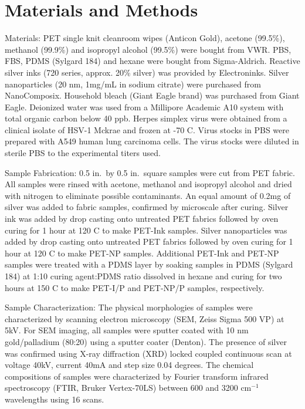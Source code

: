 \documentclass[10pt,letterpaper]{article}
\begin{document}
\section*{Materials and Methods}
Materials: PET single knit cleanroom wipes (Anticon Gold), acetone (99.5\%), methanol (99.9\%) and isopropyl alcohol (99.5\%) were bought from VWR.  PBS, FBS, PDMS (Sylgard 184) and hexane were bought from Sigma-Aldrich. Reactive silver inks (720 series, approx. 20\% silver) was provided by Electroninks. Silver nanoparticles (20 nm, 1mg/mL in sodium citrate) were purchased from NanoComposix. Household bleach (Giant Eagle brand) was purchased from Giant Eagle. Deionized water was used from a Millipore Academic A10 system with total organic carbon below 40 ppb. Herpes simplex virus were obtained from a clinical isolate of HSV-1 Mckrae and frozen at -70 \degree C. Virus stocks in PBS were prepared with A549 human lung carcinoma cells. The virus stocks were diluted in sterile PBS to the experimental titers used.

Sample Fabrication: 0.5 in.~by 0.5 in.~square samples were cut from PET fabric. All samples were rinsed with acetone, methanol and isopropyl alcohol and dried with nitrogen to eliminate possible contaminants. An equal amount of 0.2mg of silver was added to fabric samples, confirmed by microscale after curing. Silver ink was added by drop casting onto untreated PET fabrics followed by oven curing for 1 hour at 120 \degree C to make PET-Ink samples. Silver nanoparticles was added by drop casting onto untreated PET fabrics followed by oven curing for 1 hour at 120 \degree C to make PET-NP samples. Additional PET-Ink and PET-NP samples were treated with a PDMS layer by soaking samples in PDMS (Sylgard 184) at 1:10 curing agent:PDMS ratio dissolved in hexane and curing for two hours at 150 \degree C to make PET-I/P and PET-NP/P samples, respectively. 


Sample Characterization: The physical morphologies of samples were characterized by scanning electron microscopy (SEM, Zeiss Sigma 500 VP) at 5kV. For SEM imaging, all samples were sputter coated with 10 nm gold/palladium (80:20) using a sputter coater (Denton). The presence of silver was confirmed using X-ray diffraction (XRD) locked coupled continuous scan at voltage 40kV, current 40mA and step size 0.04 degrees. The chemical compositions of samples were characterized by Fourier transform infrared spectroscopy (FTIR, Bruker Vertex-70LS) between 600 and 3200 cm$^{-1}$ wavelengths using 16 scans. 
\end{document}
